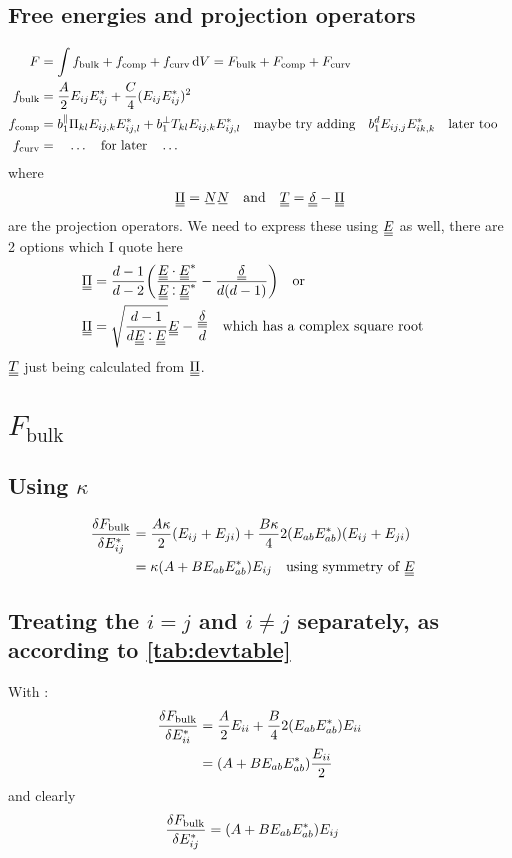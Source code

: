 \documentclass[11pt]{article}
\begin{document}
\subsection{Free energies and projection operators}
\begin{align}
    F & = \int f_\text{bulk} + f_\text{comp} + f_\text{curv} \dd{V} = F_\text{bulk} + F_\text{comp} + F_\text{curv}\\
    f_\text{bulk} & = \frac{A}{2} E_{ij}E_{ij}^* + \frac{C}{4} (E_{ij}E_{ij}^*)^2 \\
    f_\text{comp} & = b_1^\parallel \Pi_{kl} E_{ij,k}E_{ij,l}^* + b_1^\perp T_{kl} E_{ij,k}E_{ij,l}^* \qq{maybe try adding} b_1^d E_{ij,j}E_{ik,k}^* \qq{later too} \\
    f_\text{curv} & = \quad \ldots \qq{for later} \ldots \\
\end{align}
where
\begin{align}
    \du{\Pi} = \su{N} \su{N} && \text{and} && \du{T} = \du{\delta} - \du{\Pi}
\end{align}
are the projection operators. We need to express these using $\du{E}$ as well, there are 2 options which I quote here
\begin{align}
    \du{\Pi} & = \frac{d-1}{d-2}\qty(\frac{\du{E} \cdot \du{E}^*}{\du{E} \cddot \du{E}^*} - \frac{\du{\delta}}{d(d-1)}) \qq{or} \label{eq:piex1}\\
    \du{\Pi} & = \sqrt{\frac{d-1}{d \du{E} \cddot \du{E}}} \du{E} - \frac{\du{\delta}}{d} \label{eq:piex2} \qq{which has a complex square root}
\end{align}
$\du{T}$ just being calculated from $\du{\Pi}$.

\pagebreak
\section{$F_\text{bulk}$}
\subsection{Using $\kappa$}
\begin{align}
    \fdv{F_\text{bulk}}{E_{ij}^*} &= \frac{A\kappa}{2}(E_{ij} + E_{ji}) + \frac{B\kappa}{4} 2(E_{ab}E_{ab}^*)(E_{ij}+E_{ji}) \\
    &= \kappa(A + B E_{ab}E_{ab}^*) E_{ij} \qq{using symmetry of \EE}
\end{align}

\subsection{Treating the $i=j$ and $i\neq j$ separately, as according to \cref{tab:devtable}}
With :
\begin{align}
    \fdv{F_\text{bulk}}{E_{ii}^*} &= \frac{A}{2}E_{ii} + \frac{B}{4} 2(E_{ab}E_{ab}^*)E_{ii} \\
    &= (A + B E_{ab}E_{ab}^*)\frac{E_{ii}}{2}
\end{align}
and clearly
\begin{align}
    \fdv{F_\text{bulk}}{E_{ij}^*} &= (A + B E_{ab}E_{ab}^*) E_{ij}
\end{align}
\end{document}

